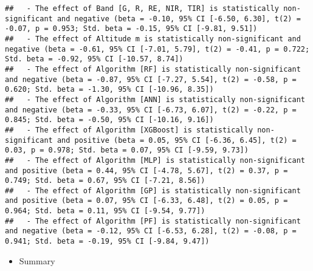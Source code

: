 \documentclass[
]{article}
\newenvironment{Shaded}{\begin{snugshade}}{\end{snugshade}}
\newcommand{\AttributeTok}[1]{\textcolor[rgb]{0.13,0.29,0.53}{#1}}
\newcommand{\CommentTok}[1]{\textcolor[rgb]{0.56,0.35,0.01}{\textit{#1}}}
\newcommand{\FunctionTok}[1]{\textcolor[rgb]{0.13,0.29,0.53}{\textbf{#1}}}
\newcommand{\NormalTok}[1]{#1}
\newcommand{\OtherTok}[1]{\textcolor[rgb]{0.56,0.35,0.01}{#1}}
\newcommand{\SpecialCharTok}[1]{\textcolor[rgb]{0.81,0.36,0.00}{\textbf{#1}}}
\newcommand{\StringTok}[1]{\textcolor[rgb]{0.31,0.60,0.02}{#1}}
\providecommand{\tightlist}{%
  \setlength{\itemsep}{0pt}\setlength{\parskip}{0pt}}
\begin{document}
\begin{verbatim}
##   - The effect of Band [G, R, RE, NIR, TIR] is statistically non-significant and negative (beta = -0.10, 95% CI [-6.50, 6.30], t(2) = -0.07, p = 0.953; Std. beta = -0.15, 95% CI [-9.81, 9.51])
##   - The effect of Altitude m is statistically non-significant and negative (beta = -0.61, 95% CI [-7.01, 5.79], t(2) = -0.41, p = 0.722; Std. beta = -0.92, 95% CI [-10.57, 8.74])
##   - The effect of Algorithm [RF] is statistically non-significant and negative (beta = -0.87, 95% CI [-7.27, 5.54], t(2) = -0.58, p = 0.620; Std. beta = -1.30, 95% CI [-10.96, 8.35])
##   - The effect of Algorithm [ANN] is statistically non-significant and negative (beta = -0.33, 95% CI [-6.73, 6.07], t(2) = -0.22, p = 0.845; Std. beta = -0.50, 95% CI [-10.16, 9.16])
##   - The effect of Algorithm [XGBoost] is statistically non-significant and positive (beta = 0.05, 95% CI [-6.36, 6.45], t(2) = 0.03, p = 0.978; Std. beta = 0.07, 95% CI [-9.59, 9.73])
##   - The effect of Algorithm [MLP] is statistically non-significant and positive (beta = 0.44, 95% CI [-4.78, 5.67], t(2) = 0.37, p = 0.749; Std. beta = 0.67, 95% CI [-7.21, 8.56])
##   - The effect of Algorithm [GP] is statistically non-significant and positive (beta = 0.07, 95% CI [-6.33, 6.48], t(2) = 0.05, p = 0.964; Std. beta = 0.11, 95% CI [-9.54, 9.77])
##   - The effect of Algorithm [PF] is statistically non-significant and negative (beta = -0.12, 95% CI [-6.53, 6.28], t(2) = -0.08, p = 0.941; Std. beta = -0.19, 95% CI [-9.84, 9.47])
\end{verbatim}

\begin{itemize}
\tightlist
\item
  Summary
\end{itemize}

\begin{Shaded}
\end{Shaded}
\end{document}
